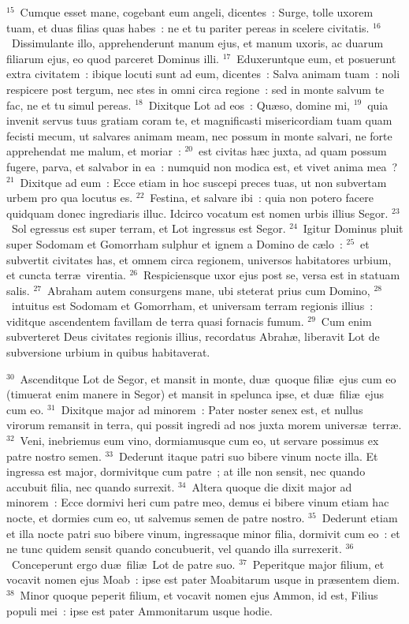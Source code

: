 ${}^{15}$~Cumque esset mane, cogebant eum angeli, dicentes~: Surge, tolle uxorem tuam, et duas filias quas habes~: ne et tu pariter pereas in scelere civitatis.
${}^{16}$~Dissimulante illo, apprehenderunt manum ejus, et manum uxoris, ac duarum filiarum ejus, eo quod parceret Dominus illi.
${}^{17}$~Eduxeruntque eum, et posuerunt extra civitatem~: ibique locuti sunt ad eum, dicentes~: Salva animam tuam~: noli respicere post tergum, nec stes in omni circa regione~: sed in monte salvum te fac, ne et tu simul pereas.
${}^{18}$~Dixitque Lot ad eos~: Qu\ae so, domine mi,
${}^{19}$~quia invenit servus tuus gratiam coram te, et magnificasti misericordiam tuam quam fecisti mecum, ut salvares animam meam, nec possum in monte salvari, ne forte apprehendat me malum, et moriar~:
${}^{20}$~est civitas h\ae c juxta, ad quam possum fugere, parva, et salvabor in ea~: numquid non modica est, et vivet anima mea~?
${}^{21}$~Dixitque ad eum~: Ecce etiam in hoc suscepi preces tuas, ut non subvertam urbem pro qua locutus es.
${}^{22}$~Festina, et salvare ibi~: quia non potero facere quidquam donec ingrediaris illuc. Idcirco vocatum est nomen urbis illius Segor.
${}^{23}$~Sol egressus est super terram, et Lot ingressus est Segor.
${}^{24}$~Igitur Dominus pluit super Sodomam et Gomorrham sulphur et ignem a Domino de c\ae lo~:
${}^{25}$~et subvertit civitates has, et omnem circa regionem, universos habitatores urbium, et cuncta terr\ae\ virentia.
${}^{26}$~Respiciensque uxor ejus post se, versa est in statuam salis.
${}^{27}$~Abraham autem consurgens mane, ubi steterat prius cum Domino,
${}^{28}$~intuitus est Sodomam et Gomorrham, et universam terram regionis illius~: viditque ascendentem favillam de terra quasi fornacis fumum.
${}^{29}$~Cum enim subverteret Deus civitates regionis illius, recordatus Abrah\ae , liberavit Lot de subversione urbium in quibus habitaverat.


${}^{30}$~Ascenditque Lot de Segor, et mansit in monte, du\ae\ quoque fili\ae\ ejus cum eo (timuerat enim manere in Segor) et mansit in spelunca ipse, et du\ae\ fili\ae\ ejus cum eo.
${}^{31}$~Dixitque major ad minorem~: Pater noster senex est, et nullus virorum remansit in terra, qui possit ingredi ad nos juxta morem univers\ae\ terr\ae .
${}^{32}$~Veni, inebriemus eum vino, dormiamusque cum eo, ut servare possimus ex patre nostro semen.
${}^{33}$~Dederunt itaque patri suo bibere vinum nocte illa. Et ingressa est major, dormivitque cum patre~; at ille non sensit, nec quando accubuit filia, nec quando surrexit.
${}^{34}$~Altera quoque die dixit major ad minorem~: Ecce dormivi heri cum patre meo, demus ei bibere vinum etiam hac nocte, et dormies cum eo, ut salvemus semen de patre nostro.
${}^{35}$~Dederunt etiam et illa nocte patri suo bibere vinum, ingressaque minor filia, dormivit cum eo~: et ne tunc quidem sensit quando concubuerit, vel quando illa surrexerit.
${}^{36}$~Conceperunt ergo du\ae\ fili\ae\ Lot de patre suo.
${}^{37}$~Peperitque major filium, et vocavit nomen ejus Moab~: ipse est pater Moabitarum usque in pr\ae sentem diem.
${}^{38}$~Minor quoque peperit filium, et vocavit nomen ejus Ammon, id est, Filius populi mei~: ipse est pater Ammonitarum usque hodie.

